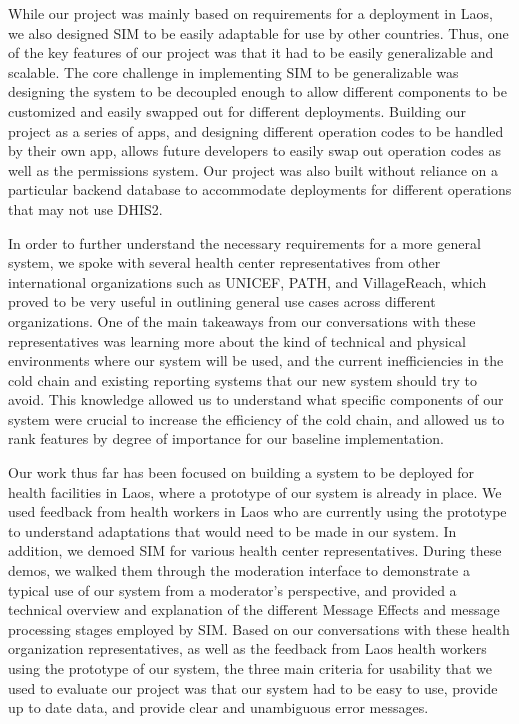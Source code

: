 \documentclass{acm_proc_article-sp}
\begin{document}
While our project was mainly based on requirements for a deployment in Laos, we also designed SIM to be easily adaptable for use by other countries. Thus, one of the key features of our project was that it had to be easily generalizable and scalable. The core challenge in implementing SIM to be generalizable was designing the system to be decoupled enough to allow different components to be customized and easily swapped out for different deployments. Building our project as a series of apps, and designing different operation codes to be handled by their own app, allows future developers to easily swap out operation codes as well as the permissions system. Our project was also built without reliance on a particular backend database to accommodate deployments for different operations that may not use DHIS2.

In order to further understand the necessary requirements for a more general system, we spoke with several health center representatives from other international organizations such as UNICEF, PATH, and VillageReach, which proved to be very useful in outlining general use cases across different organizations. One of the main takeaways from our conversations with these representatives was learning more about the kind of technical and physical environments where our system will be used, and the current inefficiencies in the cold chain and existing reporting systems that our new system should try to avoid. This knowledge allowed us to understand what specific components of our system were crucial to increase the efficiency of the cold chain, and allowed us to rank features by degree of importance for our baseline implementation.

Our work thus far has been focused on building a system to be deployed for health facilities in Laos, where a prototype of our system is already in place. We used feedback from health workers in Laos who are currently using the prototype to understand adaptations that would need to be made in our system. In addition, we demoed SIM for various health center representatives. During these demos, we walked them through the moderation interface to demonstrate a typical use of our system from a moderator's perspective, and provided a technical overview and explanation of the different Message Effects and message processing stages employed by SIM. Based on our conversations with these health organization representatives, as well as the feedback from Laos health workers using the prototype of our system, the three main criteria for usability that we used to evaluate our project was that our system had to be easy to use, provide up to date data, and provide clear and unambiguous error messages.
\end{document}
